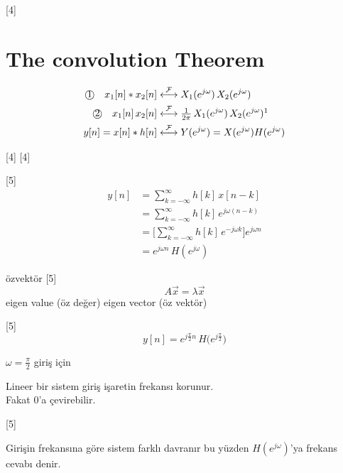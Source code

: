\documentclass[11pt,a4paper]{article}
\begin{document}
[4]

\section{The convolution Theorem}
\begin{align*}
\text{\textcircled{1}}\quad x_1[n]*x_2[n] &\overset{\mathcal{F}}{\longleftrightarrow} X_1(e^{j\omega})\,X_2(e^{j\omega})\\
\text{\textcircled{2}}\quad x_1[n]\,x_2[n] &\overset{\mathcal{F}}{\longleftrightarrow} \tfrac{1}{2\pi}\,X_1(e^{j\omega})\,X_2(e^{j\omega})\footnotemark\\
y[n]=x[n]*h[n] &\overset{\mathcal{F}}{\longleftrightarrow} Y(e^{j\omega})=X(e^{j\omega})H(e^{j\omega})
\end{align*}

[4]
[4]

[5]
\begin{align*}
y[n] &= \sum_{k=-\infty}^{\infty} h[k]\,x[n-k]\\
&= \sum_{k=-\infty}^{\infty} h[k]\,e^{j\omega(n-k)}\\
&= \Big[\sum_{k=-\infty}^{\infty} h[k]\,e^{-j\omega k}\Big]e^{j\omega n}\\
&= e^{j\omega n}\,H(e^{j\omega})
\end{align*}

özvektör
[5]
\[ A\vec{x}=\lambda\vec{x} \]
eigen value (öz değer) \qquad eigen vector (öz vektör)

[5]
\[ y[n]=e^{j\frac{\pi}{2}n}\,H\big(e^{j\frac{\pi}{2}}\big) \]
 \quad {} \quad {}

$\omega=\frac{\pi}{2}$ giriş için


Lineer bir sistem giriş işaretin frekansı korunur.\\
Fakat 0'a çevirebilir.

[5]

Girişin frekansına göre sistem farklı davranır bu yüzden $H(e^{j\omega})$'ya frekans cevabı denir.
\end{document}
